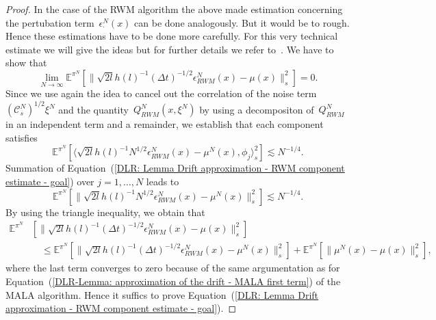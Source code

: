 \begin{proof}
 In the case of the RWM algorithm the above made estimation concerning the pertubation term~$\epsilon_{\cdot}^N (x)$ can be done analogously. But it would be to rough. Hence these estimations have to be done more carefully. For this very technical estimate we will give the ideas but for further details we refer to~\autocite{Mattingly2010}. We have to show that 
 \begin{equation}
   \label{DLR: Lemma Drift approximation - RWM estimate - goal}
   \lim_{N \to \infty} \mathbb{E}^{\pi^N}[ \|  \sqrt{2l}h(l)^{-1} (\Delta t)^{-1/2} \epsilon_{RWM}^N (x)  - \mu(x) \|_{s}^2 ] = 0.
 \end{equation}
 Since we use again the idea to cancel out the correlation of the noise term~$ (\mathcal{C}_s^N)^{1/2} \xi^N$ and the quantity~$ Q^N_{RWM}(x, \xi^N)$ by using a decompositon of~$ Q^N_{RWM}$ in an independent term and a remainder, we establish that each component satisfies
 \begin{equation}
   \label{DLR: Lemma Drift approximation - RWM component estimate - goal}
    \mathbb{E}^{\pi^N}[ \langle \sqrt{2l}h(l)^{-1} N^{1/2} \epsilon_{RWM}^N (x)  - \mu^N(x) , \phi_j \rangle_s^2] \lesssim N^{-1/4}.
 \end{equation}
 Summation of Equation~(\ref{DLR: Lemma Drift approximation - RWM component estimate - goal}) over $j = 1, \dots, N$ leads to 
 \begin{equation}
  \label{DLR: Lemma Drift approximation - RWM estimate almost - goal}
  \mathbb{E}^{\pi^N}[ \|  \sqrt{2l}h(l)^{-1} N^{1/2} \epsilon_{RWM}^N (x)  - \mu^N(x) \|_{s}^2 ] \lesssim  N^{-1/4}.
 \end{equation}
 By using the triangle inequality, we obtain that
 \begin{align*}
  \mathbb{E}^{\pi^N} & [ \|  \sqrt{2l}h(l)^{-1} (\Delta t)^{-1/2} \epsilon_{RWM}^N (x)  - \mu(x) \|_{s}^2 ] \\
  & \quad \leq  \mathbb{E}^{\pi^N}  [ \|  \sqrt{2l}h(l)^{-1} (\Delta t)^{-1/2} \epsilon_{RWM}^N (x)  - \mu^N(x) \|_{s}^2 ] +  \mathbb{E}^{\pi^N}  [ \|  \mu^N (x)  - \mu(x) \|_{s}^2 ],
 \end{align*}
 where the last term converges to zero because of the same argumentation as for Equation~(\ref{DLR-Lemma: approximation of the drift - MALA first term}) of the MALA algorithm. Hence it suffics to prove Equation~(\ref{DLR: Lemma Drift approximation - RWM component estimate - goal}).



\end{proof}
